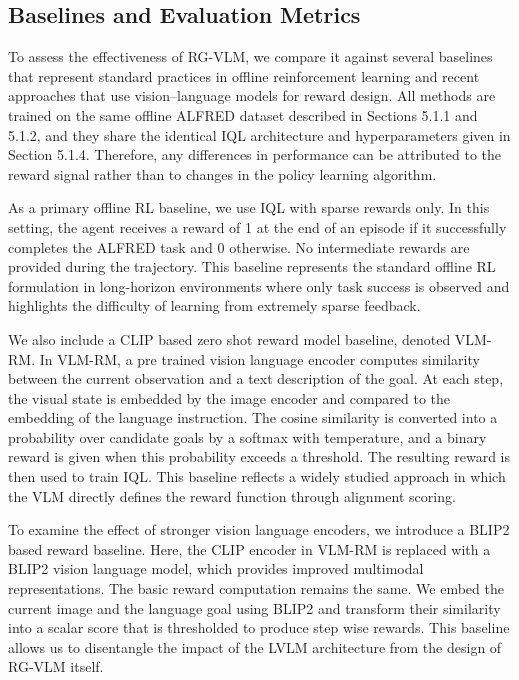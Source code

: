\documentclass[master,english,final]{kaist-ucs}
\begin{document}
\subsection{Baselines and Evaluation Metrics}
To assess the effectiveness of RG-VLM, we compare it against several baselines that represent standard practices in offline reinforcement learning and recent approaches that use vision–language models for reward design. All methods are trained on the same offline ALFRED dataset described in Sections 5.1.1 and 5.1.2, and they share the identical IQL architecture and hyperparameters given in Section 5.1.4. Therefore, any differences in performance can be attributed to the reward signal rather than to changes in the policy learning algorithm.

As a primary offline RL baseline, we use IQL with sparse rewards only. In this setting, the agent receives a reward of 1 at the end of an episode if it successfully completes the ALFRED task and 0 otherwise. No intermediate rewards are provided during the trajectory. This baseline represents the standard offline RL formulation in long-horizon environments where only task success is observed and highlights the difficulty of learning from extremely sparse feedback.

We also include a CLIP\cite{radford2021learning} based zero shot reward model baseline, denoted VLM-RM\cite{rocamonde2023vision}. In VLM-RM, a pre trained vision language encoder computes similarity between the current observation and a text description of the goal. At each step, the visual state is embedded by the image encoder and compared to the embedding of the language instruction. The cosine similarity is converted into a probability over candidate goals by a softmax with temperature, and a binary reward is given when this probability exceeds a threshold. The resulting reward is then used to train IQL\cite{wang2023implicit}. This baseline reflects a widely studied approach in which the VLM directly defines the reward function through alignment scoring.

To examine the effect of stronger vision language encoders, we introduce a BLIP2\cite{li2022blip} based reward baseline. Here, the CLIP\cite{radford2021learning} encoder in VLM-RM is replaced with a BLIP2\cite{li2022blip} vision language model, which provides improved multimodal representations. The basic reward computation remains the same. We embed the current image and the language goal using BLIP2\cite{li2022blip} and transform their similarity into a scalar score that is thresholded to produce step wise rewards. This baseline allows us to disentangle the impact of the LVLM architecture from the design of RG-VLM itself.
\end{document}
